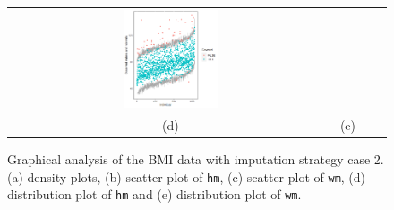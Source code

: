 \begin{figure} [ht!]
\begin{tabular}{cccc}
			\includegraphics[width=0.3\textwidth]{plots/distributioncase2wm} \\
			\textnormal{(d)}  & \textnormal{(e)}  \\[6pt]
		\end{tabular}
		\caption{Graphical analysis of the BMI data with imputation strategy case 2. (a) density plots, (b) scatter plot of \texttt{hm}, (c) scatter plot of \texttt{wm}, (d) distribution plot of \texttt{hm} and (e) distribution plot of \texttt{wm}.}
		\label{fig6_10}
	\end{figure}
	
